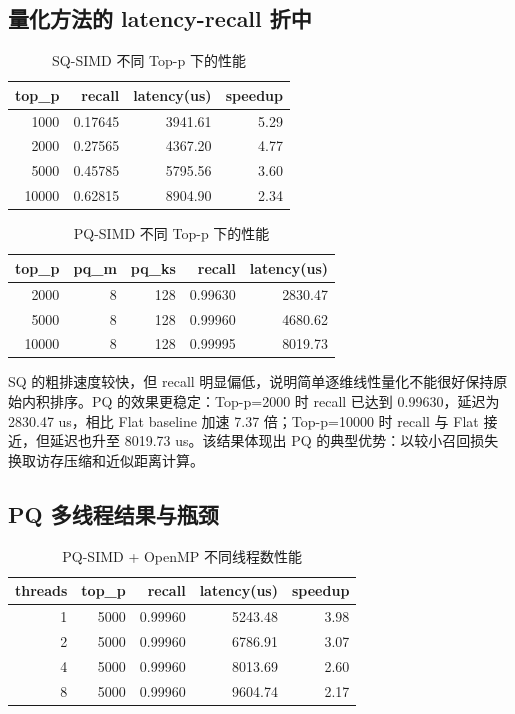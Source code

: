 \documentclass[UTF8,a4paper,10pt]{ctexart}
\begin{document}
\subsection{量化方法的 latency-recall 折中}

\begin{table}[H]
\centering
\caption{SQ-SIMD 不同 Top-p 下的性能}
\label{tab:sq_results}
\begin{tabular}{rrrr}
\toprule
top\_p & recall & latency(us) & speedup \\
\midrule
1000 & 0.17645 & 3941.61 & 5.29 \\
2000 & 0.27565 & 4367.20 & 4.77 \\
5000 & 0.45785 & 5795.56 & 3.60 \\
10000 & 0.62815 & 8904.90 & 2.34 \\
\bottomrule
\end{tabular}
\end{table}

\begin{table}[H]
\centering
\caption{PQ-SIMD 不同 Top-p 下的性能}
\label{tab:pq_results}
\begin{tabular}{rrrrr}
\toprule
top\_p & pq\_m & pq\_ks & recall & latency(us) \\
\midrule
2000 & 8 & 128 & 0.99630 & 2830.47 \\
5000 & 8 & 128 & 0.99960 & 4680.62 \\
10000 & 8 & 128 & 0.99995 & 8019.73 \\
\bottomrule
\end{tabular}
\end{table}

SQ 的粗排速度较快，但 recall 明显偏低，说明简单逐维线性量化不能很好保持原始内积排序。PQ 的效果更稳定：Top-p=2000 时 recall 已达到 0.99630，延迟为 2830.47 us，相比 Flat baseline 加速 7.37 倍；Top-p=10000 时 recall 与 Flat 接近，但延迟也升至 8019.73 us。该结果体现出 PQ 的典型优势：以较小召回损失换取访存压缩和近似距离计算。

\subsection{PQ 多线程结果与瓶颈}

\begin{table}[H]
\centering
\caption{PQ-SIMD + OpenMP 不同线程数性能}
\label{tab:pq_omp_results}
\begin{tabular}{rrrrr}
\toprule
threads & top\_p & recall & latency(us) & speedup \\
\midrule
1 & 5000 & 0.99960 & 5243.48 & 3.98 \\
2 & 5000 & 0.99960 & 6786.91 & 3.07 \\
4 & 5000 & 0.99960 & 8013.69 & 2.60 \\
8 & 5000 & 0.99960 & 9604.74 & 2.17 \\
\bottomrule
\end{tabular}
\end{table}
\end{document}
